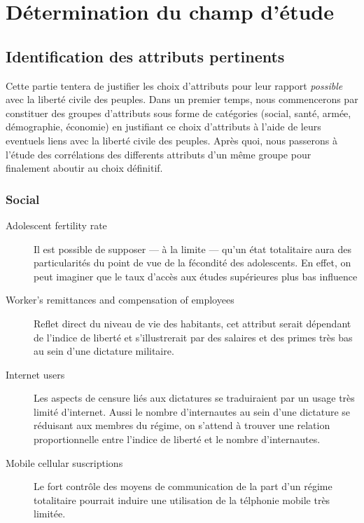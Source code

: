 \section{Détermination du champ d'étude}
\subsection{Identification des attributs pertinents}

Cette partie tentera de justifier les choix d'attributs pour leur rapport \emph{possible} avec la liberté civile des peuples.
Dans un premier temps, nous commencerons par constituer des groupes d'attributs sous forme de catégories (social, santé, armée, démographie, économie) en justifiant ce choix d'attributs à l'aide de leurs eventuels liens avec la liberté civile des peuples.
Après quoi, nous passerons à l'étude des corrélations des differents attributs d'un même groupe pour finalement aboutir au choix définitif.

\subsubsection{Social}
\begin{description}
\item [Adolescent fertility rate] 
Il est possible de supposer --- à la limite --- qu'un état totalitaire aura des particularités du point de vue de la fécondité des adolescents. En effet, on peut imaginer que le taux d'accès aux études supérieures plus bas influence 
\item [Worker's remittances and compensation of employees]
Reflet direct du niveau de vie des habitants, cet attribut serait dépendant de l'indice de liberté et s'illustrerait par des salaires et des primes très bas au sein d'une dictature militaire.
\item [Internet users]
Les aspects de censure liés aux dictatures se traduiraient par un usage très limité d'internet. Aussi le nombre d'internautes 
au sein d'une dictature se réduisant aux membres du régime, on s'attend à trouver une relation proportionnelle entre l'indice de liberté et le nombre d'internautes.
\item [Mobile cellular suscriptions]
Le fort contrôle des moyens de communication de la part d'un régime totalitaire pourrait induire une utilisation de la télphonie mobile très limitée.
\end{description}

